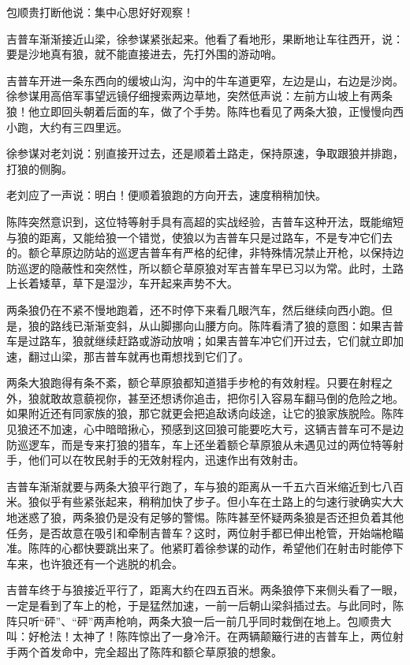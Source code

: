 \par 包顺贵打断他说：集中心思好好观察！
\par 
\par 吉普车渐渐接近山梁，徐参谋紧张起来。他看了看地形，果断地让车往西开，说：要是沙地真有狼，就不能直接进去，先打外围的游动哨。
\par 吉普车开进一条东西向的缓坡山沟，沟中的牛车道更窄，左边是山，右边是沙岗。徐参谋用高倍军事望远镜仔细搜索两边草地，突然低声说：左前方山坡上有两条狼！他立即回头朝着后面的车，做了个手势。陈阵也看见了两条大狼，正慢慢向西小跑，大约有三四里远。
\par 徐参谋对老刘说：别直接开过去，还是顺着土路走，保持原速，争取跟狼并排跑，打狼的侧胸。
\par 老刘应了一声说：明白！便顺着狼跑的方向开去，速度稍稍加快。
\par 陈阵突然意识到，这位特等射手具有高超的实战经验，吉普车这种开法，既能缩短与狼的距离，又能给狼一个错觉，使狼以为吉普车只是过路车，不是专冲它们去的。额仑草原边防站的巡逻吉普车有严格的纪律，非特殊情况禁止开枪，以保持边防巡逻的隐蔽性和突然性，所以额仑草原狼对军吉普车早已习以为常。此时，土路上长着矮草，草下是湿沙，车开起来声势不大。
\par 两条狼仍在不紧不慢地跑着，还不时停下来看几眼汽车，然后继续向西小跑。但是，狼的路线已渐渐变斜，从山脚挪向山腰方向。陈阵看清了狼的意图：如果吉普车是过路车，狼就继续赶路或游动放哨；如果吉普车冲它们开过去，它们就立即加速，翻过山梁，那吉普车就再也甭想找到它们了。
\par 两条大狼跑得有条不紊，额仑草原狼都知道猎手步枪的有效射程。只要在射程之外，狼就敢故意藐视你，甚至还想诱你追击，把你引入容易车翻马倒的危险之地。如果附近还有同家族的狼，那它就更会把追敌诱向歧途，让它的狼家族脱险。陈阵见狼还不加速，心中暗暗揪心，预感到这回狼可能要吃大亏，这辆吉普车可不是边防巡逻车，而是专来打狼的猎车，车上还坐着额仑草原狼从未遇见过的两位特等射手，他们可以在牧民射手的无效射程内，迅速作出有效射击。
\par 吉普车渐渐就要与两条大狼平行跑了，车与狼的距离从一千五六百米缩近到七八百米。狼似乎有些紧张起来，稍稍加快了步子。但小车在土路上的匀速行驶确实大大地迷惑了狼，两条狼仍是没有足够的警惕。陈阵甚至怀疑两条狼是否还担负着其他任务，是否故意在吸引和牵制吉普车？这时，两位射手都已伸出枪管，开始端枪瞄准。陈阵的心都快要跳出来了。他紧盯着徐参谋的动作，希望他们在射击时能停下车来，也许狼还有一个逃脱的机会。
\par 吉普车终于与狼接近平行了，距离大约在四五百米。两条狼停下来侧头看了一眼，一定是看到了车上的枪，于是猛然加速，一前一后朝山梁斜插过去。与此同时，陈阵只听“砰”、“砰”两声枪响，两条大狼一后一前几乎同时栽倒在地上。包顺贵大叫：好枪法！太神了！陈阵惊出了一身冷汗。在两辆颠簸行进的吉普车上，两位射手两个首发命中，完全超出了陈阵和额仑草原狼的想象。
